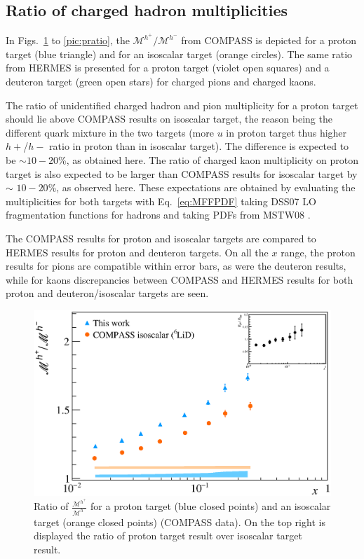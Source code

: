 \subsection{Ratio of charged hadron multiplicities}

In Figs.~\ref{pic:hratio} to \ref{pic:pratio}, the $\mathscr{M}^{h^+}/\mathscr{M}^{h^-}$ from COMPASS is depicted for a proton target (blue triangle) and for an isoscalar target (orange circles). The same ratio from HERMES is presented for a proton target (violet open squares) and a deuteron target (green open stars) for charged pions and charged kaons.

The ratio of unidentified charged hadron and pion multiplicity for a proton target should lie above COMPASS results on isoscalar target, the reason being the different quark mixture in the two targets (more $u$ in proton target thus higher $h+$/$h-$ ratio in proton than in isoscalar target). The difference is expected to be $\sim$$10-20$\%, as obtained here. The ratio of charged kaon multiplicity on proton target is also expected to be larger than COMPASS results for isoscalar target by $\sim$ $10-20$\%, as observed here. These expectations are obtained by evaluating the multiplicities for both targets with Eq.~\ref{eq:MFFPDF} taking DSS07 \cite{DSS07} LO fragmentation functions for hadrons and taking PDFs from MSTW08 \cite{MSTW08}.

The COMPASS results for proton and isoscalar targets are compared to HERMES results for proton and deuteron targets. On all the $x$ range, the proton results for pions are compatible within error bars, as were the deuteron results, while for kaons discrepancies between COMPASS and HERMES results for both proton and deuteron/isoscalar targets are seen.

\newpage

\begin{figure}[!h]
  \centering
	\includegraphics[scale=0.5]{./gfx/Mult_h_ratio.eps}
	\caption{Ratio of $\frac{\mathscr{M}^{h^+}}{\mathscr{M}^{h^-}}$ for a proton target (blue closed points) and an isoscalar target (orange closed points) (COMPASS data). On the top right is displayed the ratio of proton target result over isoscalar target result.}
	\label{pic:hratio}
\end{figure}

